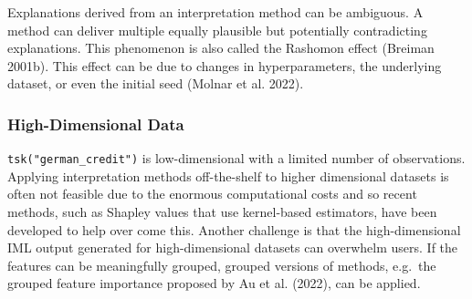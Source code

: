 Explanations derived from an interpretation method can be ambiguous. A
method can deliver multiple equally plausible but potentially
contradicting explanations. This phenomenon is also called the
Rashomon effect (Breiman 2001b). This effect can be due
to changes in hyperparameters, the underlying dataset, or even the
initial seed (Molnar et al. 2022).

\hypertarget{high-dimensional-data}{%
\subsubsection*{High-Dimensional Data}\label{high-dimensional-data}}

\texttt{tsk("german\_credit")} is low-dimensional with a limited number
of observations. Applying interpretation methods off-the-shelf to higher
dimensional datasets is often not feasible due to the enormous
computational costs and so recent methods, such as Shapley values that
use kernel-based estimators, have been developed to help over come this.
Another challenge is that the high-dimensional IML output generated for
high-dimensional datasets can overwhelm users. If the features can be
meaningfully grouped, grouped versions of methods, e.g.~the grouped
feature importance proposed by Au et al. (2022), can be applied.

